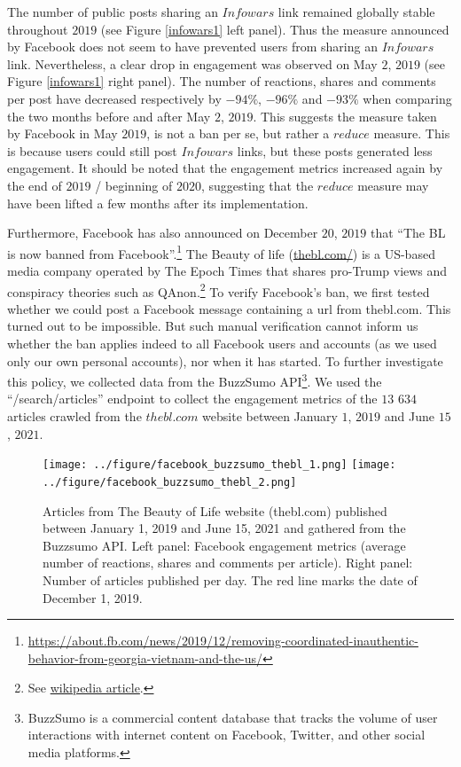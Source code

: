 \documentclass{article}
\begin{document}
The number of public posts sharing an $Infowars$ link remained globally stable throughout $2019$ (see Figure \ref{infowars1} left panel). 
Thus the measure announced by Facebook does not seem to have prevented users from sharing an $Infowars$ link. Nevertheless, a clear drop in engagement was observed on May $2$, $2019$ (see Figure \ref{infowars1} right panel). 
The number of reactions, shares and comments per post have decreased respectively  by $-94\%$,  $-96\%$ and $-93\%$  when comparing the two months before and after May $2$, $2019$. This suggests the measure taken by Facebook in May $2019$, is not a ban per se, but rather a $reduce$ measure. This is because users could still post $Infowars$ links, but these posts generated less engagement. It should be noted that the engagement metrics increased again by the end of $2019$ / beginning of $2020$, suggesting that the $reduce$ measure may have been lifted a few months after its implementation.

Furthermore, Facebook has also announced on December $20$, $2019$ that ``The BL is now banned from Facebook''.\footnote{\url{https://about.fb.com/news/2019/12/removing-coordinated-inauthentic-behavior-from-georgia-vietnam-and-the-us/}} The Beauty of life (\href{https://thebl.com/}{thebl.com/}) is a US-based media company operated by The Epoch Times that shares pro-Trump views and conspiracy theories such as QAnon.\footnote{ See \href{https://en.wikipedia.org/wiki/The\_Epoch\_Times\#Removal\_of\_The\_BL\_(The\_Beauty\_of\_Life)\_from\_Facebook}{wikipedia article}.} To verify Facebook’s ban, we first tested whether we could post a Facebook message containing a url from thebl.com. This turned out to be impossible. But such manual verification cannot inform us whether the ban applies indeed to all Facebook users and accounts (as we used only our own personal accounts), nor when it has started. To further investigate this policy, we collected data from the BuzzSumo API\footnote{BuzzSumo is a commercial content database that tracks the volume of user interactions with internet content on Facebook, Twitter, and other social media platforms.}. We used the ``/search/articles'' endpoint to collect the engagement metrics of the $13$ $634$ articles crawled from the $thebl.com$ website between January $1$, $2019$ and June $15$, $2021$.

\begin{figure}[h]
\hspace{-2em}
		\texttt{[image: ../figure/facebook\_buzzsumo\_thebl\_1.png]}
		\texttt{[image: ../figure/facebook\_buzzsumo\_thebl\_2.png]} 
	\caption{Articles from The Beauty of Life website (thebl.com) published between January 1, 2019 and June 15, 2021 and gathered from the Buzzsumo API. Left panel: Facebook engagement metrics (average number of reactions, shares and comments per article). Right panel: Number of articles published per day. The red line marks the date of December 1, 2019. }
	\label{fb_bl}
\end{figure}
\end{document}
